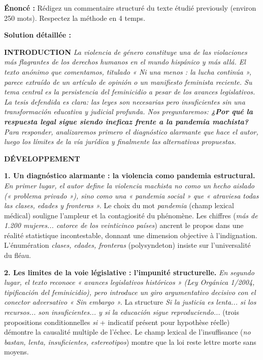 \documentclass[11pt]{article}
\begin{document}
\begin{exoresolu}
\textbf{Énoncé :} Rédigez un commentaire structuré du texte étudié previously (environ 250 mots). Respectez la méthode en 4 temps.

\tcblower
\textbf{Solution détaillée :}

\textbf{INTRODUCTION}
\emph{La violencia de género constituye una de las violaciones más flagrantes de los derechos humanos en el mundo hispánico y más allá. El texto anónimo que comentamos, titulado « Ni una menos : la lucha continúa », parece extraído de un artículo de opinión o un manifiesto feminista reciente. Su tema central es la persistencia del feminicidio a pesar de los avances legislativos. La tesis defendida es clara: las leyes son necesarias pero insuficientes sin una transformación educativa y judicial profunda. Nos preguntaremos: \textbf{¿Por qué la respuesta legal sigue siendo ineficaz frente a la pandemia machista?} Para responder, analizaremos primero el diagnóstico alarmante que hace el autor, luego los límites de la vía jurídica y finalmente las alternativas propuestas.}

\textbf{DÉVELOPPEMENT}

\textbf{1. Un diagnóstico alarmante : la violencia como pandemia estructural.}
\emph{En primer lugar, el autor define la violencia machista no como un hecho aislado (« problema privado »), sino como una « pandemia social » que « atraviesa todas las clases, edades y fronteras ».} Le choix du mot \emph{pandemia} (champ lexical médical) souligne l'ampleur et la contagiosité du phénomène. Les chiffres (\emph{más de 1.200 mujeres... catorce de los veinticinco países}) ancrent le propos dans une réalité statistique incontestable, donnant une dimension objective à l'indignation. L'énumération \emph{clases, edades, fronteras} (polysyndeton) insiste sur l'universalité du fléau.

\textbf{2. Les limites de la voie législative : l'impunité structurelle.}
\emph{En segundo lugar, el texto reconoce « avances legislativos históricos » (Ley Orgánica 1/2004, tipificación del feminicidio), pero introduce un giro argumentativo decisivo con el conector adversativo « Sin embargo ».} La structure \emph{Si la justicia es lenta... si los recursos... son insuficientes... y si la educación sigue reproduciendo...} (trois propositions conditionnelles \emph{si} + indicatif présent pour hypothèse réelle) démontre la causalité multiple de l'échec. Le champ lexical de l'insuffisance (\emph{no bastan, lenta, insuficientes, estereotipos}) montre que la loi reste lettre morte sans moyens.


\end{exoresolu}
\end{document}
